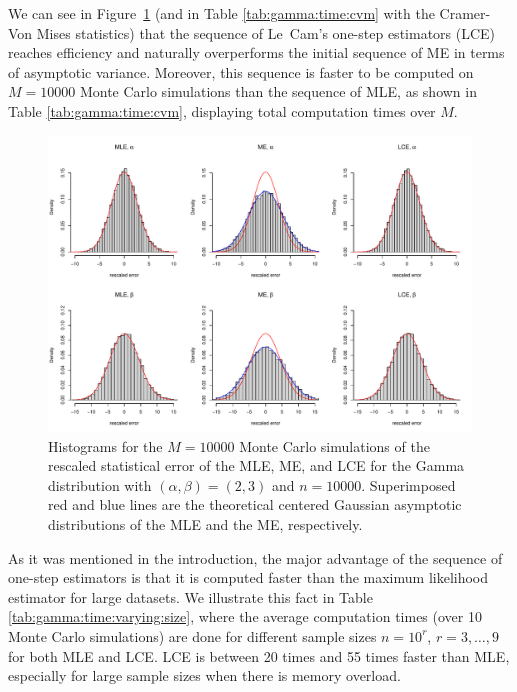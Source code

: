 We can see in Figure~\ref{fig:gamma} (and in Table \ref{tab:gamma:time:cvm} with the Cramer-Von Mises statistics) that the sequence of Le~Cam's one-step estimators (LCE) reaches efficiency and naturally overperforms the initial sequence of ME in terms of asymptotic variance. Moreover, this sequence is faster to be computed on $M=10000$ Monte Carlo simulations than the sequence of MLE, as shown in Table \ref{tab:gamma:time:cvm}, displaying total computation times over $M$. 

\begin{figure}[ht]
\centering
\includegraphics[width=\textwidth]{fig-Gamma.pdf}
\caption{Histograms for the $M=10000$ Monte Carlo simulations of the rescaled statistical error of the MLE, ME, and LCE for the Gamma distribution with $(\alpha,\beta)=(2,3)$ and $n=10000$. Superimposed red and blue lines are the theoretical centered Gaussian asymptotic distributions of the MLE and the ME, respectively.}\label{fig:gamma}
\end{figure}



As it was mentioned in the introduction, the major
advantage of the sequence of one-step estimators is that it is computed faster than the maximum likelihood estimator for large datasets. We illustrate this fact in Table \ref{tab:gamma:time:varying:size}, where the average computation times (over 10 Monte Carlo simulations) are done for different sample sizes $n=10^r$, $r=3,\ldots,9$ for both MLE and LCE. LCE is between 20 times and 55 times faster than MLE, especially for large sample sizes when there is memory overload.


